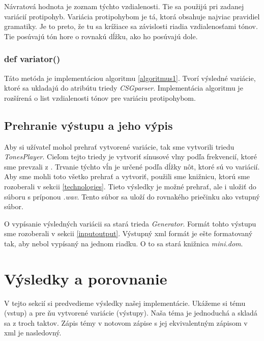 Návratová hodnota je zoznam týchto vzdialenosti. Tie sa použijú pri zadanej variácií protipohyb. Variácia protipohybom je tá, ktorá obsahuje najviac pravidiel gramatiky. Je to preto, že tu sa krížiace sa závislosti riadia vzdialenosťami tónov. Tie posúvajú tón hore o rovnakú dĺžku, ako ho posúvajú dole.

\subsubsection*{def variator()}
Táto metóda je implementáciou algoritmu \ref{algoritmus1}. Tvorí výsledné variácie, ktoré sa ukladajú do atribútu triedy \textit{CSGparser}. Implementácia algoritmu je rozšírená o list vzdialenosti tónov pre variáciu protipohybom. 

\subsection{Prehranie výstupu a jeho výpis}
Aby si užívateľ mohol prehrať vytvorené variácie, tak sme vytvorili triedu \textit{TonesPlayer}. Cieľom tejto triedy je vytvoriť sínusové vlny podľa frekvencií, ktoré sme prevzali z \cite{strankaFrekvencii}. Trvanie týchto vĺn je určené podľa dĺžky nôt, ktoré sú vo variácií. Aby sme mohli toto všetko prehrať a vytvoriť, použili sme knižnicu, ktorú sme rozoberali v sekcii \ref{technologies}. Tieto výsledky je možné prehrať, ale i uložiť do súboru s príponou \textit{.wav}. Tento súbor sa uloží do rovnakého priečinku ako vstupný súbor.

O vypísanie výsledných variácii sa stará trieda \textit{Generator}. Formát tohto výstupu sme rozoberali v sekcii \ref{inputoutput}. Výstupný xml formát je ešte formatovaný tak, aby nebol vypísaný na jednom riadku. O to sa stará knižnica \textit{mini.dom}.

\section{Výsledky a porovnanie}
V tejto sekcií si predvedieme výsledky našej implementácie. Ukážeme si tému (vstup) a pre ňu vytvorené variácie (výstupy). Naša téma je jednoduchá a skladá sa z troch taktov. Zápis témy v notovom zápise s jej ekvivalentným zápisom v xml je nasledovný.

